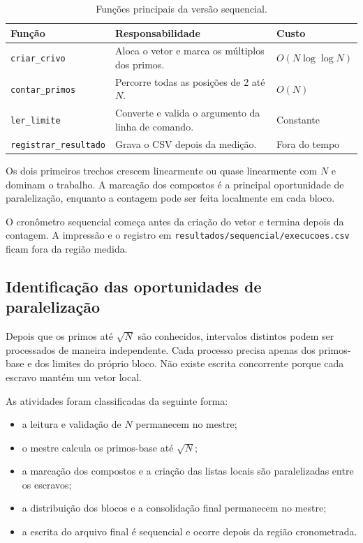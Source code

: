 \documentclass[12pt,a4paper]{article}
\begin{document}
\begin{table}[ht]
    \centering
    \caption{Funções principais da versão sequencial.}
    \label{tab:perfil-sequencial}
    \begin{tabular}{p{}p{}p{}}
        \toprule
        \textbf{Função} & \textbf{Responsabilidade} & \textbf{Custo} \\
        \midrule
        \texttt{criar\_crivo} & Aloca o vetor e marca os múltiplos dos primos. & $O(N\log\log N)$ \\
        \texttt{contar\_primos} & Percorre todas as posições de 2 até $N$. & $O(N)$ \\
        \texttt{ler\_limite} & Converte e valida o argumento da linha de comando. & Constante \\
        \texttt{registrar\_resultado} & Grava o CSV depois da medição. & Fora do tempo \\
        \bottomrule
    \end{tabular}
\end{table}

Os dois primeiros trechos crescem linearmente ou quase linearmente com $N$ e
dominam o trabalho. A marcação dos compostos é a principal oportunidade de
paralelização, enquanto a contagem pode ser feita localmente em cada bloco.

O cronômetro sequencial começa antes da criação do vetor e termina depois da
contagem. A impressão e o registro em
\texttt{resultados/sequencial/execucoes.csv} ficam fora da região medida.

\subsection{Identificação das oportunidades de paralelização}

Depois que os primos até $\sqrt{N}$ são conhecidos, intervalos distintos
podem ser processados de maneira independente. Cada processo precisa apenas
dos primos-base e dos limites do próprio bloco. Não existe escrita concorrente
porque cada escravo mantém um vetor local.

As atividades foram classificadas da seguinte forma:

\begin{itemize}
    \item a leitura e validação de $N$ permanecem no mestre;
    \item o mestre calcula os primos-base até $\sqrt{N}$;
    \item a marcação dos compostos e a criação das listas locais são
          paralelizadas entre os escravos;
    \item a distribuição dos blocos e a consolidação final permanecem no
          mestre;
    \item a escrita do arquivo final é sequencial e ocorre depois da região
          cronometrada.
\end{itemize}
\end{document}
